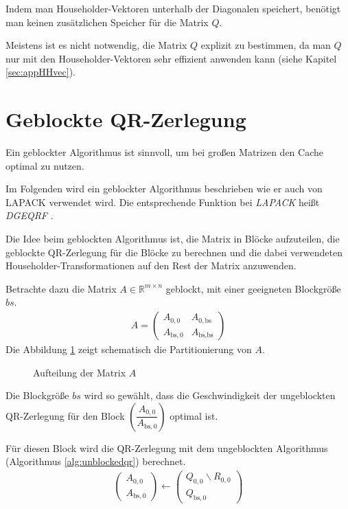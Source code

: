 Indem man Householder-Vektoren unterhalb der Diagonalen speichert, benötigt man keinen zusätzlichen Speicher für die Matrix $Q$.

Meistens ist es nicht notwendig, die Matrix $Q$ explizit zu bestimmen, da man $Q$ nur mit den Householder-Vektoren sehr effizient anwenden kann (siehe Kapitel \ref{sec:appHHvec}).



\newpage
\section{Geblockte QR-Zerlegung}
Ein geblockter Algorithmus ist sinnvoll, um bei großen Matrizen den Cache optimal zu nutzen.

Im Folgenden wird ein geblockter Algorithmus beschrieben wie er auch von LAPACK verwendet wird. Die entsprechende Funktion bei \textit{LAPACK} heißt \textit{DGEQRF} \cite{DGEQRF}.

Die Idee beim geblockten Algorithmus ist, die Matrix in Blöcke aufzuteilen, die geblockte QR-Zerlegung für die Blöcke zu berechnen und die dabei verwendeten Householder-Transformationen auf den Rest der Matrix anzuwenden.

Betrachte dazu die Matrix $A \in \mathbb{R}^{m \times n}$ geblockt, mit einer geeigneten Blockgröße $bs$.
\begin{align}
	A = \left(\begin{array}{l|l}
	A_{0, 0} & A_{0, \text{bs}} \\ \hline
	A_{\text{bs}, 0}   & A_{\text{bs}, \text{bs}} 	
	\end{array} \right) \label{equ:blockA}
\end{align}
Die Abbildung \ref{fig:blockA} zeigt schematisch die Partitionierung von $A$.

\begin{figure}[H]
	\centering
	
	\caption{Aufteilung der Matrix $A$}
	\label{fig:blockA}
\end{figure}

Die Blockgröße $bs$ wird so gewählt, dass die Geschwindigkeit der ungeblockten QR-Zerlegung für den Block $ \left(\dfrac{A_{0, 0}}{A_{\text{bs}, 0}} \right)$ optimal ist.

Für diesen Block wird die  QR-Zerlegung mit dem ungeblockten Algorithmus (Algorithmus \ref{alg:unblockedqr}) berechnet.
\begin{align}
	\left(\begin{array}{l} 
	A_{0, 0} \\ \hline
	A_{\text{bs}, 0}
	\end{array}\right)
	\leftarrow
	\left(\begin{array}{l} 
	Q_{0, 0}  \backslash R_{0,0} \\ \hline
	Q_{\text{bs}, 0} 
	\end{array}\right)
\end{align}

